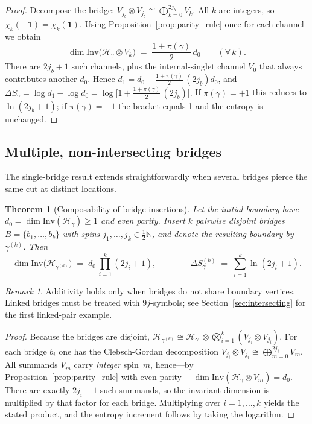 \documentclass[11pt, a4paper]{article}
\theoremstyle{plain}
\newtheorem{theorem}{Theorem}[section]
\theoremstyle{definition}
\theoremstyle{remark}
\newtheorem*{remark}{Remark}
\newcommand{\Hil}{\mathcal{H}}
\newcommand{\Inv}{\mathrm{Inv}}
\begin{document}
\begin{proof}
  Decompose the bridge:
  \(V_{j_b}\otimes V_{j_b}\cong\bigoplus_{k=0}^{2j_b}V_k\).
  All $k$ are integers, so \(\chi_k(-\mathbf1)=\chi_k(\mathbf1)\).
  Using Proposition~\ref{prop:parity_rule} once for each channel we obtain
  \[  \dim\Inv\bigl(\Hil_{\gamma}\otimes V_k\bigr)  \;=\;  \frac{1+\pi(\gamma)}2\,d_0  \qquad (\forall\,k).\]
  There are \(2j_b+1\) such channels, plus the internal-singlet channel
  \(V_0\) that always contributes another \(d_0\).
  Hence
  \(
    d_1
    =d_0
    +\frac{1+\pi(\gamma)}2\,(2j_b)d_0
  \),
  and
  \(
    \Delta S_{\gamma}
    =\log d_1-\log d_0
    =\log\!\bigl[1+\frac{1+\pi(\gamma)}2\,(2j_b)\bigr].
  \)
  If \(\pi(\gamma)=+1\) this reduces to \(\ln(2j_b+1)\); if
  \(\pi(\gamma)=-1\) the bracket equals 1 and the entropy is unchanged.
\end{proof}

\subsection{Multiple, non-intersecting bridges}

The single-bridge result extends straightforwardly when several
bridges pierce the same cut at distinct locations.

\begin{theorem}[Composability of bridge insertions]
  \label{thm:multi}
  Let the initial boundary have
  $d_{0}=\dim \Inv(\Hil_{\gamma})\ge 1$
  and even parity.
  Insert $k$ pairwise disjoint bridges
  $B=\{b_{1},\dots,b_{k}\}$ with spins
  $j_{1},\dots,j_{k}\in \tfrac12\mathbb{N}$,
  and denote the resulting boundary by $\gamma^{(k)}$.
  Then
  \[ \dim \Inv\!\bigl(\Hil_{\gamma^{(k)}}\bigr)   \;=\;   d_{0}\,\prod_{i=1}^{k} (2j_{i}+1), \qquad\qquad \Delta S_{\gamma}^{(k)}   \;=\;   \sum_{i=1}^{k}\ln (2j_{i}+1).\]
\end{theorem}

\begin{remark}
  Additivity holds only when bridges do not share boundary vertices. Linked bridges must be treated with $9j$-symbols; see Section~\ref{sec:intersecting} for the first linked-pair example.
\end{remark}

\begin{proof}
  Because the bridges are disjoint,
  \(
    \Hil_{\gamma^{(k)}}
    \cong
    \Hil_{\gamma}\;
    \otimes\!
    \bigotimes_{i=1}^{k} (V_{j_{i}}\!\otimes V_{j_{i}}).
  \)
  For each bridge $b_{i}$ one has the Clebsch-Gordan decomposition
  $V_{j_{i}}\otimes V_{j_{i}}\cong\bigoplus_{m=0}^{2j_{i}} V_{m}$.
  All summands $V_{m}$ carry \emph{integer} spin~$m$,
  hence—by Proposition~\ref{prop:parity_rule} with even parity—
  $\dim\Inv(\Hil_{\gamma}\otimes V_{m})=d_{0}$.
  There are exactly $2j_{i}+1$ such summands, so the
  invariant dimension is multiplied by that factor for each bridge.
  Multiplying over $i=1,\dots,k$ yields the stated product,
  and the entropy increment follows by taking the logarithm.
\end{proof}
\end{document}
